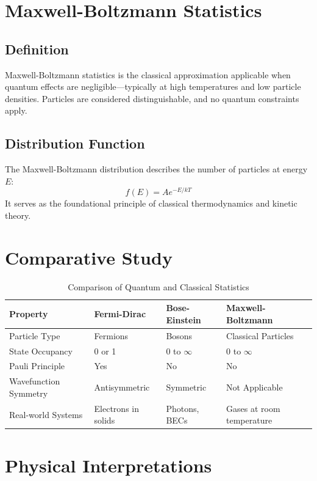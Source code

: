 \documentclass[12pt,a4paper]{article}
\begin{document}
\section{Maxwell-Boltzmann Statistics}
\subsection{Definition}
Maxwell-Boltzmann statistics is the classical approximation applicable when quantum effects are negligible—typically at high temperatures and low particle densities. Particles are considered distinguishable, and no quantum constraints apply.

\subsection{Distribution Function}
The Maxwell-Boltzmann distribution describes the number of particles at energy $E$:
\begin{equation}
f(E) = A e^{-E/kT}
\end{equation}
It serves as the foundational principle of classical thermodynamics and kinetic theory.

\section{Comparative Study}
\begin{table}[H]
    \centering
    \caption{Comparison of Quantum and Classical Statistics}
    \begin{tabular}{@{}llll@{}}
        \toprule
        Property & Fermi-Dirac & Bose-Einstein & Maxwell-Boltzmann \\
        \midrule
        Particle Type & Fermions & Bosons & Classical Particles \\
        State Occupancy & 0 or 1 & 0 to $\infty$ & 0 to $\infty$ \\
        Pauli Principle & Yes & No & No \\
        Wavefunction Symmetry & Antisymmetric & Symmetric & Not Applicable \\
        Real-world Systems & Electrons in solids & Photons, BECs & Gases at room temperature \\
        \bottomrule
    \end{tabular}
\end{table}

\section{Physical Interpretations}
\end{document}
